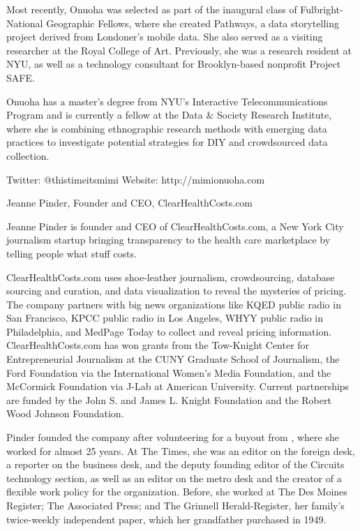 \begin{itemize}
\begin{itemize}
\begin{enumerate}
{Most recently, Onuoha was selected as part of the inaugural class of Fulbright-National Geographic Fellows, where she created Pathways,\autocite{Pathways} a data storytelling project derived from Londoner’s mobile data. She also served as a visiting researcher at the Royal College of Art. Previously, she was a research resident at NYU, as well as a technology consultant for Brooklyn-based nonprofit Project SAFE. 

Onuoha has a master’s degree from NYU’s Interactive Telecommunications Program and is currently a fellow at the Data & Society Research Institute, where she is combining ethnographic research methods with emerging data practices to investigate potential strategies for DIY and crowdsourced data collection.

Twitter: @thistimeitsmimi 
Website: http://mimionuoha.com

Jeanne Pinder, Founder and CEO, ClearHealthCosts.com

Jeanne Pinder is founder and CEO of ClearHealthCosts.com, a New York City journalism startup bringing transparency to the health care marketplace by telling people what stuff costs. 

ClearHealthCosts.com uses shoe-leather journalism, crowdsourcing, database sourcing and curation, and data visualization to reveal the mysteries of pricing. The company partners with big news organizations like KQED public radio in San Francisco, KPCC public radio in Los Angeles, WHYY public radio in Philadelphia, and MedPage Today to collect and reveal pricing information. ClearHealthCosts.com has won grants from the Tow-Knight Center for Entrepreneurial Journalism at the CUNY Graduate School of Journalism, the Ford Foundation via the International Women’s Media Foundation, and the McCormick Foundation via J-Lab at American University. Current partnerships are funded by the John S. and James L. Knight Foundation and the Robert Wood Johnson Foundation.

Pinder founded the company after volunteering for a buyout from , where she worked for almost 25 years. At The Times, she was an editor on the foreign desk, a reporter on the business desk, and the deputy founding editor of the Circuits technology section, as well as an editor on the metro desk and the creator of a flexible work policy for the organization. Before, she worked at The Des Moines Register; The Associated Press; and The Grinnell Herald-Register, her family’s twice-weekly independent paper, which her grandfather purchased in 1949.

}
\end{enumerate}
\end{itemize}
\end{itemize}
